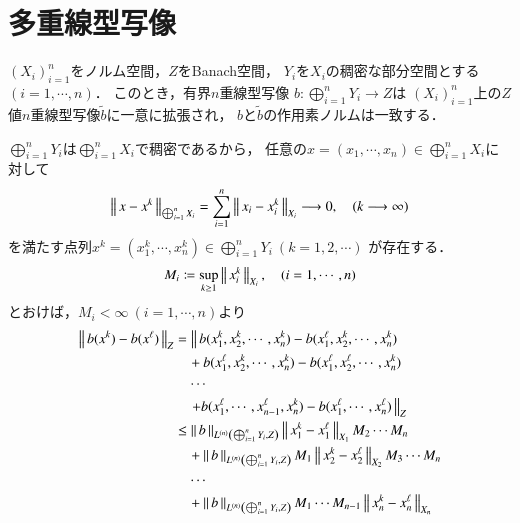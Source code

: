 \section{多重線型写像}
	
	\begin{screen}
		\begin{thm}[多重線型写像の一意拡張]\label{thm:expansion_of_multilinear_mapping}
			$(X_i)_{i=1}^{n}$をノルム空間，$Z$をBanach空間，
			$Y_i$を$X_i$の稠密な部分空間とする$(i=1,\cdots,n)$．
			このとき，有界$n$重線型写像
			$b:\bigoplus_{i=1}^n Y_i \longrightarrow Z$は
			$(X_i)_{i=1}^{n}$上の$Z$値$n$重線型写像$\tilde{b}$に一意に拡張され，
			$b$と$\tilde{b}$の作用素ノルムは一致する．
		\end{thm}
	\end{screen}
	
	\begin{prf}
		$\bigoplus_{i=1}^n Y_i$は$\bigoplus_{i=1}^n X_i$で稠密であるから，
		任意の$x = (x_1,\cdots,x_n) \in \bigoplus_{i=1}^n X_i$に対して
		\begin{align}
			\left\|\, x - x^k\, \right\|_{\bigoplus_{i=1}^n X_i}
			= \sum_{i=1}^n \left\|\, x_i - x^k_i\, \right\|_{X_i} \longrightarrow 0,
			\quad (k \longrightarrow \infty)
		\end{align}
		を満たす点列$x^k = (x^k_1,\cdots,x^k_n) \in \bigoplus_{i=1}^n Y_i\ (k=1,2,\cdots)$
		が存在する．
		\begin{align}
			M_i \coloneqq \operatorname*{sup}_{k \geq 1} \left\|\, x^k_i\, \right\|_{X_i},
			\quad (i=1,\cdots,n)
		\end{align}
		とおけば，$M_i < \infty\ (i=1,\cdots,n)$より
		\begin{align}
			\Norm{b(x^k) - b(x^\ell)}{Z}
			&= \left\|\, b(x^k_1,x^k_2,\cdots,x^k_n) - b(x^\ell_1,x^k_2,\cdots,x^k_n) \right. \\
				&\quad + b(x^\ell_1,x^k_2,\cdots,x^k_n) - b(x^\ell_1,x^\ell_2,\cdots,x^k_n) \\
				&\quad \cdots \\
				&\quad \left. + b(x^\ell_1,\cdots,x^\ell_{n-1},x^k_n) - b(x^\ell_1,\cdots,x^\ell_n)\,  \right\|_Z \\
			&\leq \Norm{b}{\ContLn{\bigoplus_{i=1}^n Y_i}{Z}{n}} \Norm{x^k_1 - x^\ell_1}{X_1} M_2 \cdots M_n \\
			&\quad + \Norm{b}{\ContLn{\bigoplus_{i=1}^n Y_i}{Z}{n}} M_1 \Norm{x^k_2 - x^\ell_2}{X_2} M_3 \cdots M_n \\
			&\quad \cdots \\
			&\quad + \Norm{b}{\ContLn{\bigoplus_{i=1}^n Y_i}{Z}{n}} M_1 \cdots M_{n-1} \Norm{x^k_n - x^\ell_n}{X_n} \\

\end{align}
\end{prf}
